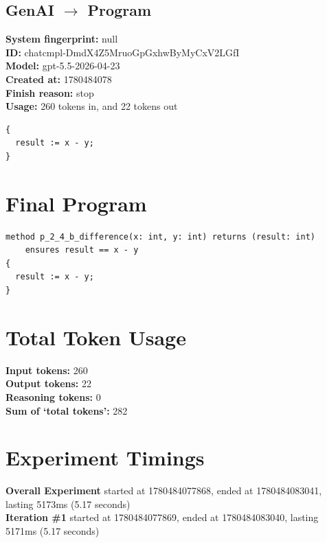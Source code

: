 \documentclass{article}
\begin{document}
\subsection*{GenAI $\rightarrow$ Program}
\textbf{System fingerprint: }null
\\\textbf{ID: }chatcmpl-DmdX4Z5MruoGpGxhwByMyCxV2LGfI
\\\textbf{Model: }gpt-5.5-2026-04-23
\\\textbf{Created at: }1780484078
\\\textbf{Finish reason: }stop
\\\textbf{Usage: }260 tokens in, and 22 tokens out
\begin{lstlisting}
{
  result := x - y;
}
\end{lstlisting}
\section*{Final Program}
\begin{lstlisting}
method p_2_4_b_difference(x: int, y: int) returns (result: int)
	ensures result == x - y
{
  result := x - y;
}
\end{lstlisting}
\section*{Total Token Usage}
\textbf{Input tokens: }260
\\\textbf{Output tokens: }22
\\\textbf{Reasoning tokens: }0
\\\textbf{Sum of `total tokens': }282
\section*{Experiment Timings}
\textbf{Overall Experiment} started at 1780484077868, ended at 1780484083041, lasting 5173ms (5.17 seconds)
\\\textbf{Iteration \#1} started at 1780484077869, ended at 1780484083040, lasting 5171ms (5.17 seconds)
\end{document}
